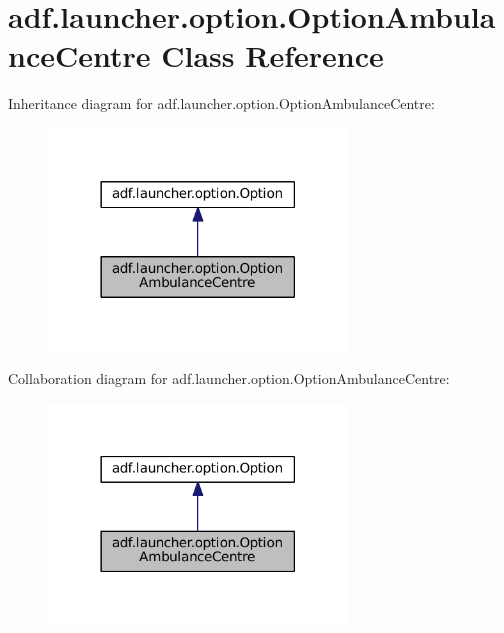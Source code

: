 \hypertarget{classadf_1_1launcher_1_1option_1_1OptionAmbulanceCentre}{}\section{adf.\+launcher.\+option.\+Option\+Ambulance\+Centre Class Reference}
\label{classadf_1_1launcher_1_1option_1_1OptionAmbulanceCentre}


Inheritance diagram for adf.\+launcher.\+option.\+Option\+Ambulance\+Centre\+:
\nopagebreak
\begin{figure}[H]
\begin{center}
\leavevmode
\includegraphics[width=225pt]{classadf_1_1launcher_1_1option_1_1OptionAmbulanceCentre__inherit__graph}
\end{center}
\end{figure}


Collaboration diagram for adf.\+launcher.\+option.\+Option\+Ambulance\+Centre\+:
\nopagebreak
\begin{figure}[H]
\begin{center}
\leavevmode
\includegraphics[width=225pt]{classadf_1_1launcher_1_1option_1_1OptionAmbulanceCentre__coll__graph}
\end{center}
\end{figure}
